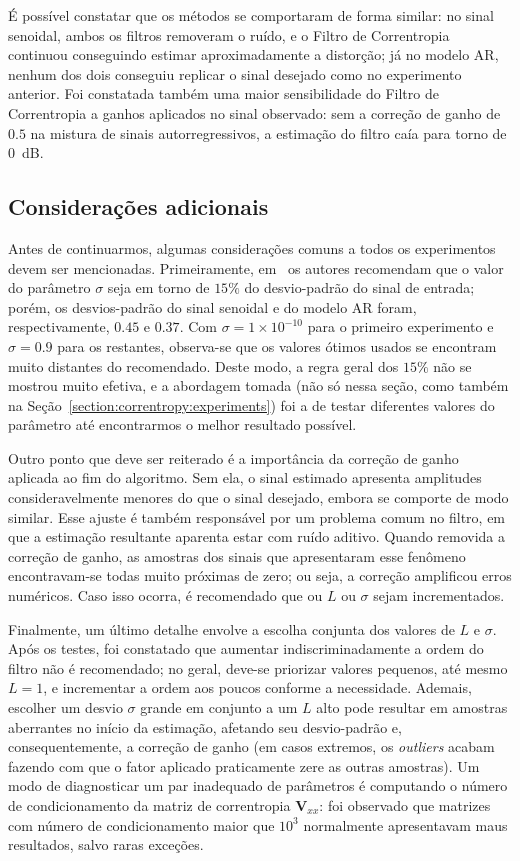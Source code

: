 É possível constatar que os métodos se comportaram de forma similar: no sinal senoidal, ambos os filtros removeram o ruído, e o Filtro de Correntropia continuou conseguindo estimar aproximadamente a distorção; já no modelo AR, nenhum dos dois conseguiu replicar o sinal desejado como no experimento anterior. Foi constatada também uma maior sensibilidade do Filtro de Correntropia a ganhos aplicados no sinal observado: sem a correção de ganho de $0.5$ na mistura de sinais autorregressivos, a estimação do filtro caía para torno de $0$~dB.

\subsection{Considerações adicionais}
\label{subsec:correntropy:considerations}

Antes de continuarmos, algumas considerações comuns a todos os experimentos devem ser
mencionadas. Primeiramente, em~\cite{pokharel-2006} os autores recomendam que o valor
do parâmetro $\sigma$ seja em torno de $15\%$ do desvio-padrão do sinal de entrada;
porém, os desvios-padrão do sinal senoidal e do modelo AR foram, respectivamente,
$0.45$ e $0.37$. Com $\sigma = 1 \times 10^{-10}$ para o primeiro experimento e $\sigma
	= 0.9$ para os restantes, observa-se que os valores ótimos usados se encontram muito
distantes do recomendado. Deste modo, a regra geral dos $15\%$ não se mostrou muito
efetiva, e a abordagem tomada (não só nessa seção, como também na
Seção~\ref{section:correntropy:experiments}) foi a de testar diferentes valores do
parâmetro até encontrarmos o melhor resultado possível.

Outro ponto que deve ser reiterado é a importância da correção de ganho aplicada ao fim
do algoritmo. Sem ela, o sinal estimado apresenta amplitudes consideravelmente menores
do que o sinal desejado, embora se comporte de modo similar. Esse ajuste é também
responsável por um problema comum no filtro, em que a estimação resultante aparenta
estar com ruído aditivo. Quando removida a correção de ganho, as amostras dos sinais
que apresentaram esse fenômeno encontravam-se todas muito próximas de zero; ou seja, a
correção amplificou erros numéricos. Caso isso ocorra, é recomendado que ou $L$ ou
$\sigma$ sejam incrementados.

Finalmente, um último detalhe envolve a escolha conjunta dos valores de $L$ e $\sigma$.
Após os testes, foi constatado que aumentar indiscriminadamente a ordem do filtro não é
recomendado; no geral, deve-se priorizar valores pequenos, até mesmo $L = 1$, e
incrementar a ordem aos poucos conforme a necessidade. Ademais, escolher um desvio
$\sigma$ grande em conjunto a um $L$ alto pode resultar em amostras aberrantes no
início da estimação, afetando seu desvio-padrão e, consequentemente, a correção de
ganho (em casos extremos, os \textit{outliers} acabam fazendo com que o fator aplicado
praticamente zere as outras amostras). Um modo de diagnosticar um par inadequado de
parâmetros é computando o número de condicionamento da matriz de correntropia
$\mathbf{V}_{xx}$: foi observado que matrizes com número de condicionamento maior que
$10^3$ normalmente apresentavam maus resultados, salvo raras exceções.

